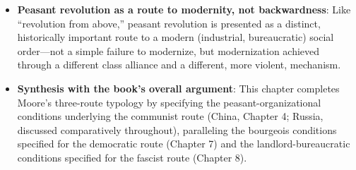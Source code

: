 \documentclass[12pt]{article}
\begin{document}
\begin{itemize}[leftmargin=*, itemsep=4pt]
    \item \textbf{Peasant revolution as a route to modernity, not backwardness}: Like ``revolution from above,'' peasant revolution is presented as a distinct, historically important route to a modern (industrial, bureaucratic) social order---not a simple failure to modernize, but modernization achieved through a different class alliance and a different, more violent, mechanism.
    \item \textbf{Synthesis with the book's overall argument}: This chapter completes Moore's three-route typology by specifying the peasant-organizational conditions underlying the communist route (China, Chapter 4; Russia, discussed comparatively throughout), paralleling the bourgeois conditions specified for the democratic route (Chapter 7) and the landlord-bureaucratic conditions specified for the fascist route (Chapter 8).
\end{itemize}
\end{document}

